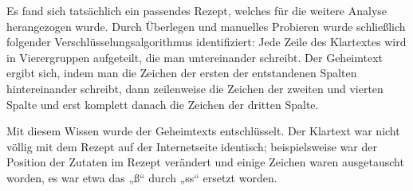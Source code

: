 Es fand sich tatsächlich ein passendes Rezept, welches für die weitere Analyse
herangezogen wurde. Durch Überlegen und manuelles Probieren wurde schließlich
folgender Verschlüsselungsalgorithmus identifiziert: Jede Zeile des Klartextes
wird in Vierergruppen aufgeteilt, die man untereinander schreibt. Der Geheimtext
ergibt sich, indem man die Zeichen der ersten der entstandenen Spalten
hintereinander schreibt, dann zeilenweise die Zeichen der zweiten und vierten
Spalte und erst komplett danach die Zeichen der dritten Spalte.

Mit diesem Wissen wurde der Geheimtexts entschlüsselt. Der Klartext war nicht
völlig mit dem Rezept auf der Internetseite identisch; beispielsweise war der
Position der Zutaten im Rezept verändert und einige Zeichen waren ausgetauscht
worden, es war etwa das „ß“ durch „ss“ ersetzt worden.
